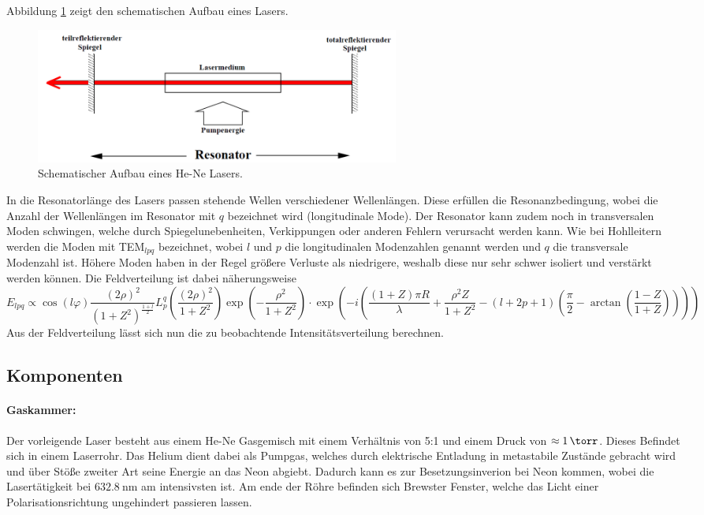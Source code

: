 Abbildung \ref{resonator} zeigt den schematischen Aufbau eines Lasers.
\begin{figure}[h!]
\centering
	\includegraphics[width = 12cm]{img/laser_schem.png}
	\caption{Schematischer Aufbau eines He-Ne Lasers.\cite{V61}}
	\label{resonator}
\end{figure}

In die Resonatorlänge des Lasers passen stehende Wellen verschiedener Wellenlängen.
Diese erfüllen die Resonanzbedingung, wobei die Anzahl der Wellenlängen im Resonator mit $q$ bezeichnet wird (longitudinale Mode).
Der Resonator kann zudem noch in transversalen Moden schwingen, welche durch Spiegelunebenheiten, Verkippungen oder anderen Fehlern verursacht werden kann.
Wie bei Hohlleitern werden die Moden mit TEM$_{lpq}$ bezeichnet, wobei $l$ und $p$ die longitudinalen Modenzahlen genannt werden und $q$ die transversale Modenzahl ist.
Höhere Moden haben in der Regel größere Verluste als niedrigere, weshalb diese nur sehr schwer isoliert und verstärkt werden können.
Die Feldverteilung ist dabei näherungsweise
\begin{equation}
	E_{lpq} \propto \cos\left({l \varphi}\right) \frac{(2\rho)^2}{(1+Z^2)^\frac{1+l}{2}} L_p^q\left(\frac{(2\rho)^2}{1+Z^2} \right) \exp\left(-\frac{\rho^2}{1+Z^2} \right) \cdot \exp\left(-i\left(\frac{(1+Z)\pi R}{\lambda} + \frac{\rho^2 Z}{1+Z^2}-(l+2p+1) \left(\frac{\pi}{2}-\arctan \left(\frac{1-Z}{1+Z} \right) \right) \right) \right)
\end{equation}
Aus der Feldverteilung lässt sich nun die zu beobachtende Intensitätsverteilung berechnen.

\subsection{Komponenten} %
\label{sub:komponenten}
\paragraph{Gaskammer:}
Der vorleigende Laser besteht aus einem He-Ne Gasgemisch mit einem Verhältnis von 5:1 und einem Druck von $\approx \SI{1}{\torr}$.
Dieses Befindet sich in einem Laserrohr.
Das Helium dient dabei als Pumpgas, welches durch elektrische Entladung in metastabile Zustände gebracht wird und über Stöße zweiter Art seine Energie an das Neon abgiebt.
Dadurch kann es zur Besetzungsinverion bei Neon kommen, wobei die Lasertätigkeit bei $\SI{632.8}{\nano\meter}$ am intensivsten ist.
Am ende der Röhre befinden sich Brewster Fenster, welche das Licht einer Polarisationsrichtung ungehindert passieren lassen.

